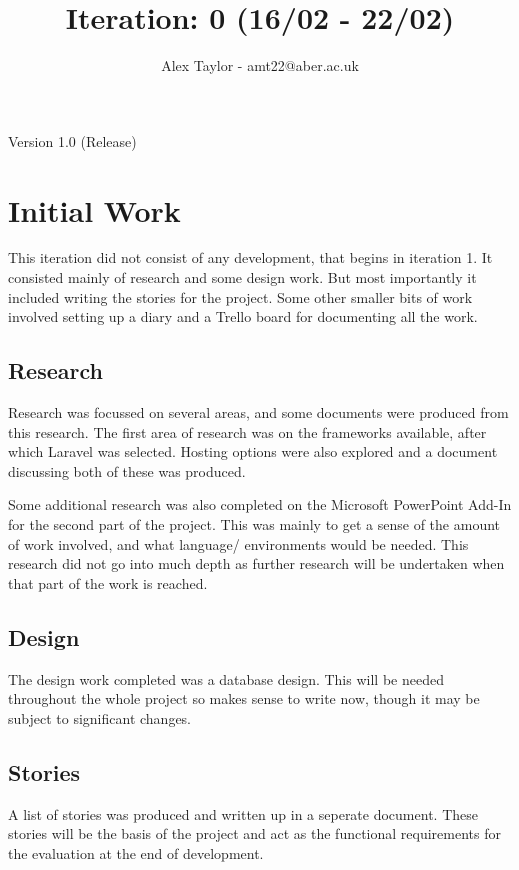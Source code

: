 \documentclass{article}
\title{Iteration: 0 (16/02 - 22/02)}
\author{Alex Taylor - amt22@aber.ac.uk}
\begin{document}
\maketitle
\begin{center}
	Version 1.0 (Release)
\end{center}
\tableofcontents
\thispagestyle{empty}
\newpage

\section{Initial Work}
This iteration did not consist of any development, that begins in iteration 1. It consisted mainly of research and some design work. But most importantly it included writing the stories for the project. Some other smaller bits of work involved setting up a diary and a Trello board for documenting all the work.
\subsection{Research}
Research was focussed on several areas, and some documents were produced from this research. The first area of research was on the frameworks available, after which Laravel was selected. Hosting options were also explored and a document discussing both of these was produced.

Some additional research was also completed on the Microsoft PowerPoint Add-In for the second part of the project. This was mainly to get a sense of the amount of work involved, and what language/ environments would be needed. This research did not go into much depth as further research will be undertaken when that part of the work is reached.
\subsection{Design}
The design work completed was a database design. This will be needed throughout the whole project so makes sense to write now, though it may be subject to significant changes.
\subsection{Stories}
A list of stories was produced and written up in a seperate document. These stories will be the basis of the project and act as the functional requirements for the evaluation at the end of development.
\newpage

%
%
\end{document}
